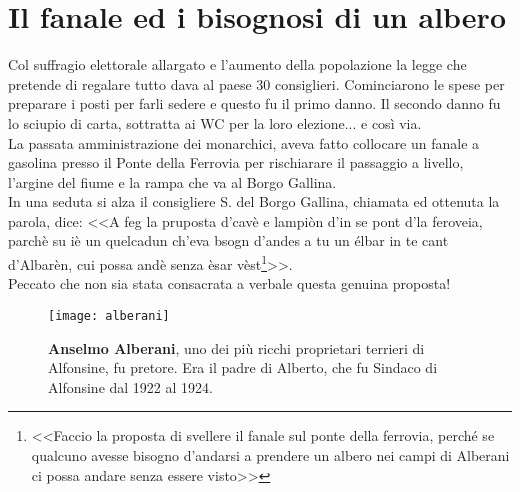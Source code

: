 
\chapter{Il fanale ed i bisognosi di un albero}
Col suffragio elettorale allargato e l'aumento della popolazione la legge che pretende di regalare tutto dava al paese 30 consiglieri. Cominciarono le spese per preparare i posti per farli sedere e questo fu il primo danno. Il secondo danno fu lo sciupio di carta, sottratta ai WC per la loro elezione... e così via.\\
\indent La passata amministrazione dei monarchici, aveva fatto collocare un fanale a gasolina presso il Ponte della Ferrovia per rischiarare il passaggio a livello, l'argine del fiume e la rampa che va al Borgo Gallina.\\
\indent In una seduta si alza il consigliere S.\: \: del Borgo Gallina, chiamata ed ottenuta la parola, dice: <<A feg la pruposta d'cavè e lampiòn d'in se pont d'la feroveia, parchè su iè un quelcadun ch'eva bsogn d'andes a tu un élbar in te cant d'Albarèn, cui possa andè senza èsar vèst\footnote{<<Faccio la proposta di svellere il fanale sul ponte della ferrovia, perché se qualcuno avesse bisogno d'andarsi a prendere un albero nei campi di Alberani ci possa andare senza essere visto>>}>>.\\
\indent Peccato che non sia stata consacrata a verbale questa genuina proposta!

 \begin{figure}[htb]
    \centering
    \texttt{[image: alberani]}
    \caption[Anselmo Alberani]{\textbf{Anselmo Alberani}, uno dei più ricchi proprietari terrieri di Alfonsine, fu pretore. Era il padre di Alberto, che fu Sindaco di Alfonsine dal 1922 al 1924.\label{fig:alberani}}
\end{figure}